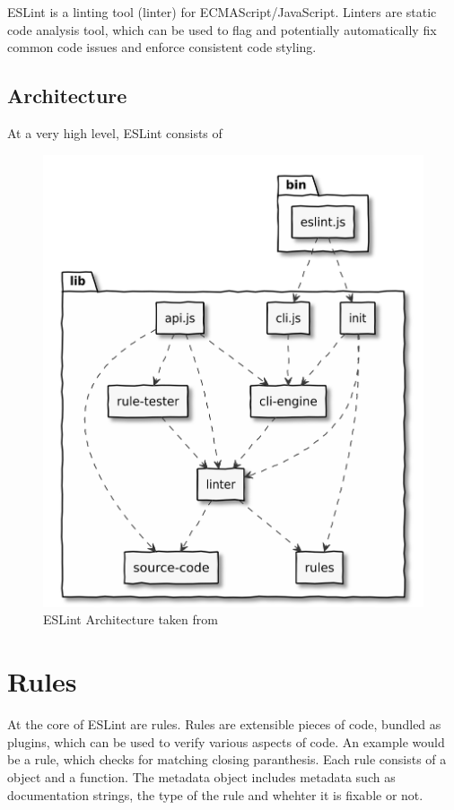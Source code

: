 ESLint \parencite{eslintMainPage} is a linting tool (linter) for ECMAScript/JavaScript. Linters are static code analysis tool, which can be used to flag and potentially automatically fix common code issues and enforce consistent code styling.


\subsection{Architecture}

At a very high level, ESLint consists of 
\begin{figure}[H]
    \includegraphics[width=\textwidth]{images/eslint_architecture.png}
     \caption{ESLint Architecture taken from \cite{eslintArchitecture}}
     \label{fig:eslintArchitecture}
   \end{figure}


\section{Rules}
At the core of ESLint are rules. Rules are extensible pieces of code, bundled as plugins, which can be used to verify various aspects of code. An example would be a rule, which checks for matching closing paranthesis. 
Each rule consists of a  object
and a  function. The metadata object includes metadata such as documentation strings, the type of the rule and whehter it is fixable or not.

